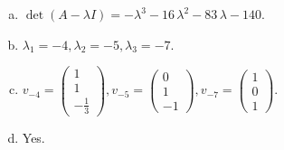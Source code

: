 \begin{questions}
\begin{solution}
\begin{enumerate}[(a)]
\item $\det(A-\lambda I)=-{\lambda}^{3} - 16 \, {\lambda}^{2} - 83 \, {\lambda} - 140$.
\item ${\lambda}_1=-4, {\lambda}_2=-5, {\lambda}_3=-7$.
\item $v_{-4}=\left(\begin{array}{r}
1 \\
1 \\
-\frac{1}{3}
\end{array}\right), v_{-5}=\left(\begin{array}{r}
0 \\
1 \\
-1
\end{array}\right), v_{-7}=\left(\begin{array}{r}
1 \\
0 \\
1
\end{array}\right)$.
\item Yes.
\end{enumerate}
\end{solution}

\end{questions}

\newpage


\begin{center}
\end{center}

